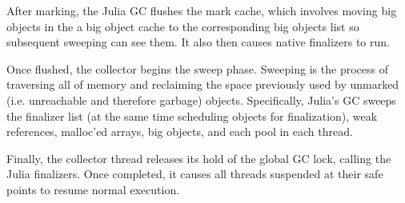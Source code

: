 After marking, the Julia GC flushes the mark cache, which involves moving big objects in the a big object cache to the corresponding big objects list so subsequent sweeping can see them.
It also then causes native finalizers to run.

Once flushed, the collector begins the sweep phase.
Sweeping is the process of traversing all of memory and reclaiming the space previously used by unmarked (i.e. unreachable and therefore garbage) objects.
Specifically, Julia's GC sweeps the finalizer list (at the same time scheduling objects for finalization), weak references, malloc'ed arrays, big objects, and each pool in each thread.

Finally, the collector thread releases its hold of the global GC lock, calling the Julia finalizers.
Once completed, it causes all threads suspended at their safe points to resume normal execution.


